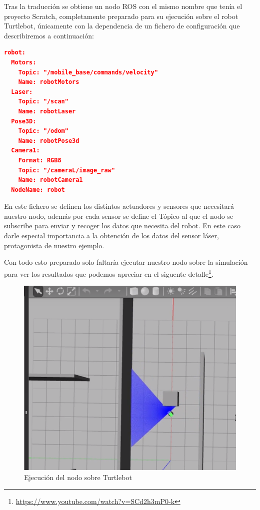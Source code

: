 Tras la traducción se obtiene un nodo ROS con el mismo nombre que tenía el proyecto Scratch, completamente preparado para su ejecución sobre el robot Turtlebot, únicamente con la dependencia de un fichero de configuración que describiremos a continuación:
\begin{lstlisting}[language=json,firstnumber=1]
robot:
  Motors:
    Topic: "/mobile_base/commands/velocity"
    Name: robotMotors
  Laser:
    Topic: "/scan"
    Name: robotLaser
  Pose3D:
    Topic: "/odom"
    Name: robotPose3d
  Camera1:
    Format: RGB8
    Topic: "/cameraL/image_raw"
    Name: robotCamera1
  NodeName: robot
\end{lstlisting}
En este fichero se definen los distintos actuadores y sensores que necesitará nuestro nodo, además por cada sensor se define el Tópico al que el nodo se subscribe para enviar y recoger los datos que necesita del robot. En este caso darle especial importancia a la obtención de los datos del sensor láser, protagonista de nuestro ejemplo.

Con todo esto preparado solo faltaría ejecutar nuestro nodo sobre la simulación para ver los resultados que podemos apreciar en el siguente detalle\footnote{\url{https://www.youtube.com/watch?v=SCd2h3mP0-k}}.

\begin{figure}[H]
    \centering
    \includegraphics[scale=0.75]{img/robot-example.PNG}
  	\caption{Ejecución del nodo sobre Turtlebot}
  	\label{turtlebot}
\end{figure}


